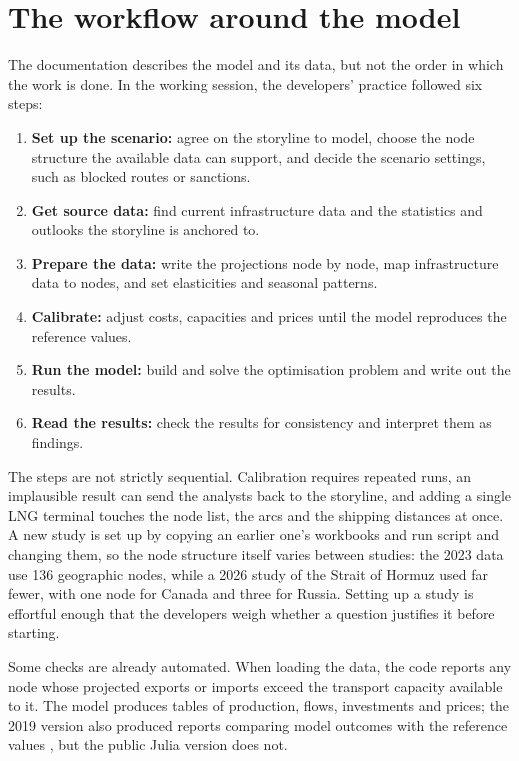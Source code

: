 \section{The workflow around the model}

The documentation describes the model and its data, but not the order in which the work is done.
In the working session, the developers' practice followed six steps:

\begin{enumerate}
  \item \textbf{Set up the scenario:} agree on the storyline to model, choose the node structure the available data can support, and decide the scenario settings, such as blocked routes or sanctions.
  \item \textbf{Get source data:} find current infrastructure data and the statistics and outlooks the storyline is anchored to.
  \item \textbf{Prepare the data:} write the projections node by node, map infrastructure data to nodes, and set elasticities and seasonal patterns.
  \item \textbf{Calibrate:} adjust costs, capacities and prices until the model reproduces the reference values.
  \item \textbf{Run the model:} build and solve the optimisation problem and write out the results.
  \item \textbf{Read the results:} check the results for consistency and interpret them as findings.
\end{enumerate}

The steps are not strictly sequential.
Calibration requires repeated runs, an implausible result can send the analysts back to the storyline, and adding a single LNG terminal touches the node list, the arcs and the shipping distances at once.
A new study is set up by copying an earlier one's workbooks and run script and changing them, so the node structure itself varies between studies: the 2023 data use 136 geographic nodes, while a 2026 study of the Strait of Hormuz used far fewer, with one node for Canada and three for Russia.
Setting up a study is effortful enough that the developers weigh whether a question justifies it before starting.

Some checks are already automated.
When loading the data, the code reports any node whose projected exports or imports exceed the transport capacity available to it.
The model produces tables of production, flows, investments and prices; the 2019 version also produced reports comparing model outcomes with the reference values \citep[p.~26]{egging2019global}, but the public Julia version does not.

